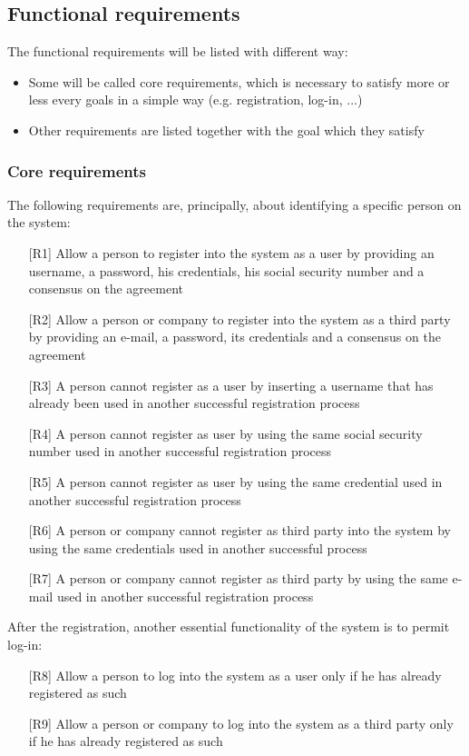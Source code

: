 \subsection{Functional requirements}
\par
The functional requirements will be listed with different way:
\begin{itemize}
\item Some will be called core requirements, which is necessary to satisfy more or less every goals in a simple way (e.g. registration, log-in, ...)
\item Other requirements are listed together with the goal which they satisfy
\end{itemize}

\subsubsection{Core requirements}
\par
The following requirements are, principally, about identifying a specific person on the system:
\begin{itemize}
\item[{[R1]}] Allow a person to register into the system as a user by providing an username, a password, his credentials, his social security number and a consensus on the agreement
\item[{[R2]}] Allow a person or company to register into the system as a third party by providing an e-mail, a password, its credentials and a consensus on the agreement
\item[{[R3]}] A person cannot register as a user by inserting a username that has already been used in another successful registration process
\item[{[R4]}] A person cannot register as user by using the same social security number used in another successful registration process 
\item[{[R5]}] A person cannot register as user by using the same credential used in another successful registration process 
\item[{[R6]}] A person or company cannot register as third party into the system by using the same credentials used in another successful process
\item[{[R7]}] A person or company cannot register as third party by using the same e-mail used in another successful registration process
\end{itemize}
\par
After the registration, another essential functionality of the system is to permit log-in:
\begin{itemize}
\item[{[R8]}] Allow a person to log into the system as a user only if he has already registered as such
\item[{[R9]}] Allow a person or company to log into the system as a third party only if he has already registered as such
\end{itemize}


